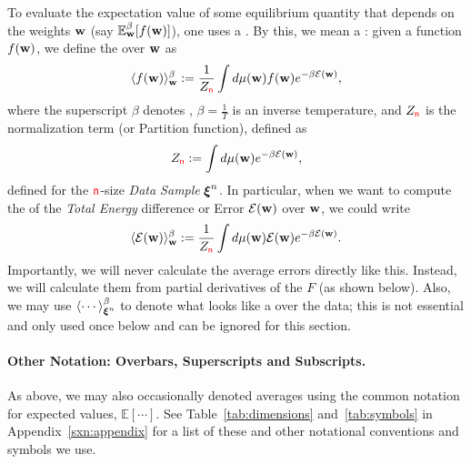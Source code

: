 To evaluate the expectation value of some equilibrium quantity that depends on the weights ${\mathbf{w}}$ (say $\mathbb{E}^{\beta}_{{\mathbf{w}}}[f({\mathbf{w}})]$), one uses a \ThermalAverage.
By this, we mean a \emph{\BoltzmannWeightedAverage}: given a function $f({\mathbf{w}})$,
we define the \ThermalAverage over ${\mathbf{w}}$ as
\begin{align}
\label{eqn:thrmavg}
\langle f({\mathbf{w}})\rangle_{{\mathbf{w}}}^{{\beta}}:=\dfrac{1}{Z_{{\color{red}\sf{n}}}}\int d\mu({\mathbf{w}}) f({\mathbf{w}})e^{-\beta \mathcal{E}(\mathbf{w})}  ,
\end{align}
where the superscript $\beta$ denotes \ThermalAverage,
$\beta=\frac{1}{T}$ is an inverse temperature, and 
$Z_{{\color{red}\sf{n}}}$ is the normalization term (or Partition function), defined as
\begin{align}
\label{eqn:Zwn}
Z_{{\color{red}\sf{n}}}:=\int d\mu({\mathbf{w}}) e^{-\beta \mathcal{E}(\mathbf{w})},
\end{align}
defined for the ${\color{red}\sf{n}}$-size \emph{Data Sample} $\boldsymbol{\xi}^{n}$.
%
In particular, when we want to compute the \ThermalAverage of the \emph{Total Energy} difference or Error
$\mathcal{E}(\mathbf{w})$ over ${\mathbf{w}}$, we could write
\begin{align}
\label{eqn:Detot}
\langle \mathcal{E}(\mathbf{w}) \rangle^{\beta}_{{\mathbf{w}}}:=\dfrac{1}{Z_{{\color{red}\sf{n}}}}\int d\mu({\mathbf{w}}) \mathcal{E}(\mathbf{w}) e^{-\beta \mathcal{E}(\mathbf{w})} .
\end{align}
Importantly, we will never calculate the average errors directly like this.
Instead, we will calculate them from partial derivatives of the \FreeEnergy $F$ (as shown below).
Also, we may use $\langle \cdots \rangle^{\beta}_{\boldsymbol{\xi}^{n}}$ to denote what looks like a \ThermalAverage over the data;
this is not essential and only used once below and can be ignored for this section.

\paragraph{Other Notation: Overbars, Superscripts and Subscripts.}
As above, we may also occasionally denoted averages using the common notation for expected values, $\mathbb{E}[\cdots]$.
See Table~\ref{tab:dimensions} and~\ref{tab:symbols} in Appendix~\ref{sxn:appendix} for a list of these and other notational conventions and symbols we use.

